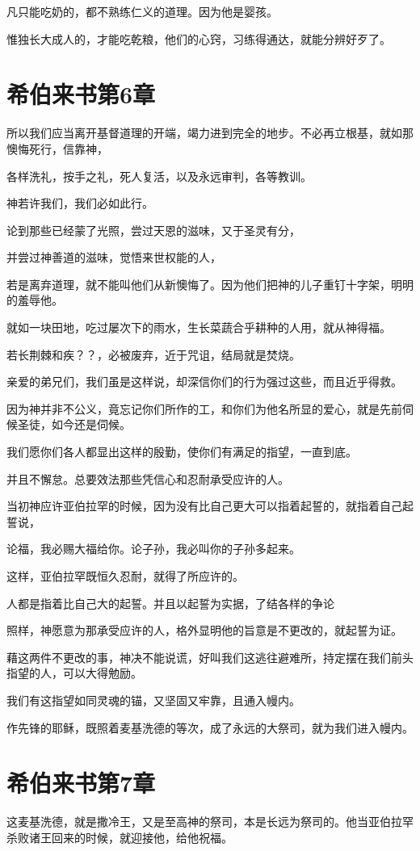 \documentclass[12pt,oneside]{book}
\begin{document}
凡只能吃奶的，都不熟练仁义的道理。因为他是婴孩。

惟独长大成人的，才能吃乾粮，他们的心窍，习练得通达，就能分辨好歹了。

\chapter{希伯来书第6章}
所以我们应当离开基督道理的开端，竭力进到完全的地步。不必再立根基，就如那懊悔死行，信靠神，

各样洗礼，按手之礼，死人复活，以及永远审判，各等教训。

神若许我们，我们必如此行。

论到那些已经蒙了光照，尝过天恩的滋味，又于圣灵有分，

并尝过神善道的滋味，觉悟来世权能的人，

若是离弃道理，就不能叫他们从新懊悔了。因为他们把神的儿子重钉十字架，明明的羞辱他。

就如一块田地，吃过屡次下的雨水，生长菜蔬合乎耕种的人用，就从神得福。

若长荆棘和疾？？，必被废弃，近于咒诅，结局就是焚烧。

亲爱的弟兄们，我们虽是这样说，却深信你们的行为强过这些，而且近乎得救。

因为神并非不公义，竟忘记你们所作的工，和你们为他名所显的爱心，就是先前伺候圣徒，如今还是伺候。

我们愿你们各人都显出这样的殷勤，使你们有满足的指望，一直到底。

并且不懈怠。总要效法那些凭信心和忍耐承受应许的人。

当初神应许亚伯拉罕的时候，因为没有比自己更大可以指着起誓的，就指着自己起誓说，

论福，我必赐大福给你。论子孙，我必叫你的子孙多起来。

这样，亚伯拉罕既恒久忍耐，就得了所应许的。

人都是指着比自己大的起誓。并且以起誓为实据，了结各样的争论

照样，神愿意为那承受应许的人，格外显明他的旨意是不更改的，就起誓为证。

藉这两件不更改的事，神决不能说谎，好叫我们这逃往避难所，持定摆在我们前头指望的人，可以大得勉励。

我们有这指望如同灵魂的锚，又坚固又牢靠，且通入幔内。

作先锋的耶稣，既照着麦基洗德的等次，成了永远的大祭司，就为我们进入幔内。

\chapter{希伯来书第7章}
这麦基洗德，就是撒冷王，又是至高神的祭司，本是长远为祭司的。他当亚伯拉罕杀败诸王回来的时候，就迎接他，给他祝福。
\end{document}

